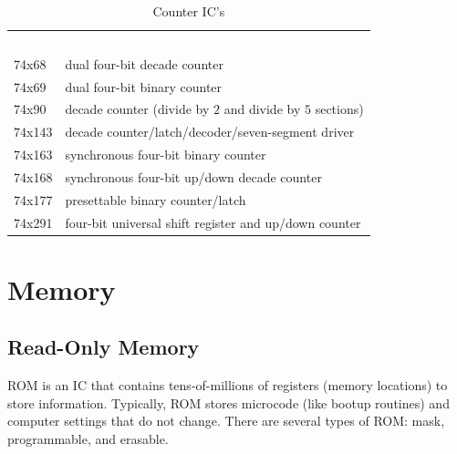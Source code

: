 \begin{table}[H]
  \sffamily
  \newcommand{\head}[1]{\textcolor{white}{\textbf{#1}}}    
  \begin{center}
    \begin{tabular}{ll} 
      \rowcolor{black!75}
      \head{IC} & \head{Function} \\
      74x68 & dual four-bit decade counter \\
      74x69 & dual four-bit binary counter \\
      74x90 & decade counter (divide by $ 2 $ and divide by $ 5 $ sections) \\
      74x143 & decade counter/latch/decoder/seven-segment driver \\
      74x163 & synchronous four-bit binary counter \\
      74x168 & synchronous four-bit up/down decade counter \\
      74x177 & presettable binary counter/latch \\
      74x291 & four-bit universal shift register and up/down counter
    \end{tabular}
  \end{center}
  \caption{Counter IC's}
  \label{sl:tab:counter_ics}
\end{table}

\section{Memory}
\label{SL:sec:memory}

\subsection{Read-Only Memory}
\label{SL:subsec:read-only_memory}

\acf{ROM} is an \ac{IC} that contains tens-of-millions of registers (memory locations) to store information. Typically, \ac{ROM} stores microcode (like bootup routines) and computer settings that do not change. There are several types of \ac{ROM}: mask, programmable, and erasable. 

